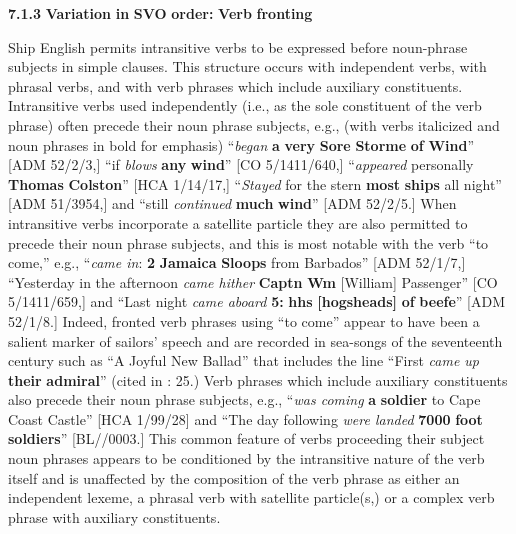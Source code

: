   \textbf{7.1.3} \textbf{Variation} \textbf{in} \textbf{SVO} \textbf{order:} \textbf{Verb} \textbf{fronting}

  Ship English permits intransitive verbs to be expressed before noun-phrase subjects in simple clauses. This structure occurs with independent verbs, with phrasal verbs, and with verb phrases which include auxiliary constituents. Intransitive verbs used independently (i.e., as the sole constituent of the verb phrase) often precede their noun phrase subjects, e.g., (with verbs italicized and noun phrases in bold for emphasis) “\textit{began} \textbf{a} \textbf{very} \textbf{Sore} \textbf{Storme} \textbf{of} \textbf{Wind}” [ADM 52/2/3,] “if \textit{blows} \textbf{any} \textbf{wind}” [CO 5/1411/640,] “\textit{appeared} personally \textbf{Thomas} \textbf{Colston}” [HCA 1/14/17,] “\textit{Stayed} for the stern \textbf{most} \textbf{ships} all night” [ADM 51/3954,] and “still \textit{continued} \textbf{much} \textbf{wind}” [ADM 52/2/5.] When intransitive verbs incorporate a satellite particle they are also permitted to precede their noun phrase subjects, and this is most notable with the verb “to come,” e.g., “\textit{came in}: \textbf{2} \textbf{Jamaica} \textbf{Sloops} from Barbados” [ADM 52/1/7,] “Yesterday in the afternoon \textit{came hither} \textbf{Captn} \textbf{Wm} [William] Passenger” [CO 5/1411/659,] and “Last night \textit{came aboard} \textbf{5:} \textbf{hhs} \textbf{[hogsheads]} \textbf{of} \textbf{beefe}” [ADM 52/1/8.] Indeed, fronted verb phrases using “to come” appear to have been a salient marker of sailors’ speech and are recorded in sea-songs of the seventeenth century such as “A Joyful New Ballad” that includes the line “First \textit{came up} \textbf{their} \textbf{admiral}” (cited in \citealt{Palmer1986}: 25.) Verb phrases which include auxiliary constituents also precede their noun phrase subjects, e.g., “\textit{was coming} \textbf{a} \textbf{soldier} to Cape Coast Castle” [HCA 1/99/28] and “The day following \textit{were landed} \textbf{7000} \textbf{foot} \textbf{soldiers}” [BL/\citealt{Egerton2395}/0003.] This common feature of verbs proceeding their subject noun phrases appears to be conditioned by the intransitive nature of the verb itself and is unaffected by the composition of the verb phrase as either an independent lexeme, a phrasal verb with satellite particle(s,) or a complex verb phrase with auxiliary constituents. 

